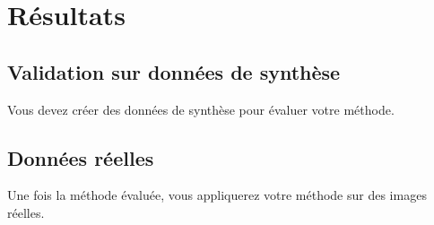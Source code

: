 \chapter{Résultats}
\section{Validation sur données de synthèse}
Vous devez créer des données de synthèse pour évaluer votre méthode.
\section{Données réelles}
Une fois la méthode évaluée, vous appliquerez votre méthode sur des images réelles.
